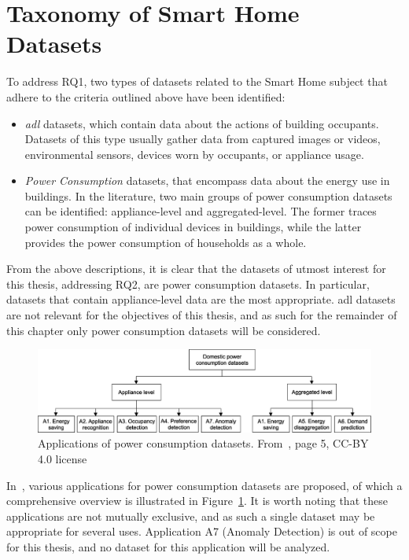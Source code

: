 \newpage

\section{Taxonomy of Smart Home Datasets}

To address RQ1, two types of datasets related to the Smart Home subject that adhere to the criteria outlined above have been identified:
\begin{itemize}
    \item \textit{\acrfull{adl}} datasets, which contain data about the actions of building occupants. Datasets of this type usually gather data from captured images or videos, environmental sensors, devices worn by occupants, or appliance usage.
    \item \textit{Power Consumption} datasets, that encompass data about the energy use in buildings. In the literature, two main groups of power consumption datasets can be identified: appliance-level and aggregated-level. The former traces power consumption of individual devices in buildings, while the latter provides the power consumption of households as a whole.
\end{itemize}
From the above descriptions, it is clear that the datasets of utmost interest for this thesis, addressing RQ2, are power consumption datasets. In particular, datasets that contain appliance-level data are the most appropriate. \acrshort{adl} datasets are not relevant for the objectives of this thesis, and as such for the remainder of this chapter only power consumption datasets will be considered.

\begin{figure}[h]
    \centering
    \includegraphics[width=.9\textwidth]{images/taxonomy_power_consumption.jpg}
    \caption[Applications of power consumption datasets]{Applications of power consumption datasets. From~\textcite{himeurBuildingPowerConsumption2020}, page 5, CC-BY 4.0 license}
    \label{fig:applications_power_consumption_datasets}
\end{figure}

In~\parencite{himeurBuildingPowerConsumption2020}, various applications for power consumption datasets are proposed, of which a comprehensive overview is illustrated in Figure~\ref{fig:applications_power_consumption_datasets}. It is worth noting that these applications are not mutually exclusive, and as such a single dataset may be appropriate for several uses. Application A7 (Anomaly Detection) is out of scope for this thesis, and no dataset for this application will be analyzed.


